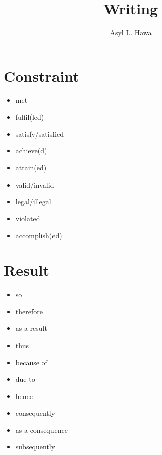 \documentclass[twocolumn, a4paper]{article}
\begin{document}
\title{Writing}
\author{Asyl L. Hawa}
\date{}
\maketitle

\section{Constraint}
{\color{red}
\begin{itemize}[leftmargin=*, noitemsep]
	\item met
	\item fulfil(led)
	\item satisfy/satisfied
	\item achieve(d)
	\item attain(ed)
	\item valid/invalid
	\item legal/illegal
	\item violated
	\item accomplish(ed)
\end{itemize}
}

\section{Result}
{\color{OrangeRed}
	\begin{itemize}[leftmargin=*, noitemsep]
		\item so
		\item therefore
		\item as a result
		\item thus
		\item because of
		\item due to
		\item hence
		\item consequently
		\item as a consequence
		\item subsequently
	\end{itemize}
}
\end{document}
